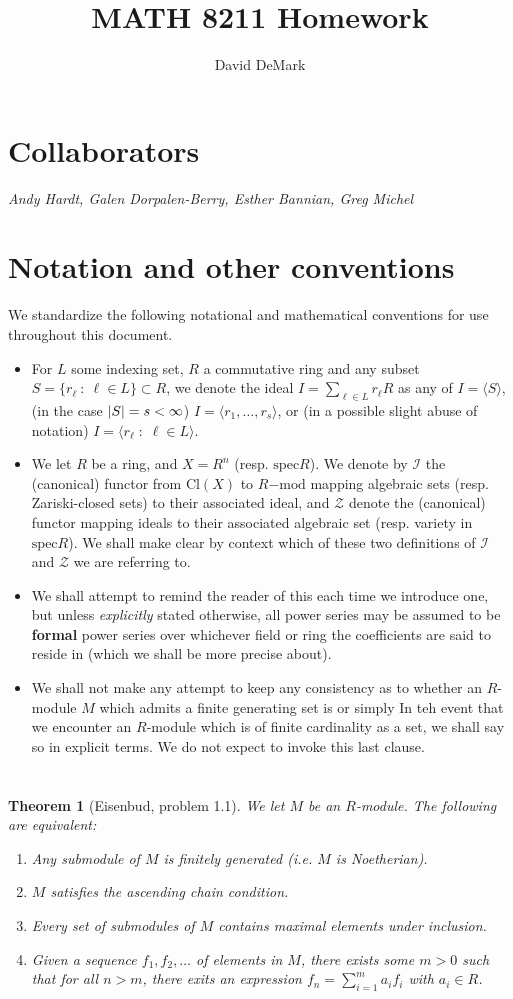 \documentclass[english]{article}
\title{MATH 8211 Homework}
\author{David DeMark}
\date{\due}
\DeclarePairedDelimiter\abs{\lvert}{\rvert}%
\newcommand{\Zcal}{\mathcal{Z}}
\newcommand{\prob}[1]{\setcounter{section}{#1-1}\section{}}
\newtheorem*{theorem*}{Theorem}
\theoremstyle{remark}
\theoremstyle{definition}
\newcommand{\gen}[1]{\langle #1 \rangle}
\newcommand{\genb}[2]{\langle #1\;:\;#2 \rangle}
\newcommand{\setc}[2]{\{ #1\::\:#2 \}}
\newcommand{\spec}{\mathrm{spec}}
\begin{document}
	\maketitle
	\section*{Collaborators}
	\textit{Andy Hardt, Galen Dorpalen-Berry, Esther Bannian, Greg Michel}
	\section*{Notation and other conventions}
	We standardize the following notational and mathematical conventions for use throughout this document. \begin{itemize}
		\item For $L$ some indexing set, $R$ a commutative ring and any subset $S=\setc{r_\ell}{\ell\in L }\subset R$, we denote the ideal $I=\sum_{\ell \in L} r_\ell R$ as any of $I=\gen{S}$, (in the case $\abs{S}=s<\infty$) $I=\gen{r_1,\hdots, r_s}$, or (in a possible slight abuse of notation) $I=\genb{r_\ell}{\ell\in L}$.
		\item We let $R$ be a ring, and $X=R^n$ (resp. $\spec R$). We denote by $\mathcal{I}$ the (canonical) functor from $\mathrm{Cl}(X)$ to $R\mathrm{-mod}$ mapping algebraic sets (resp. Zariski-closed sets) to their associated ideal, and $\mathcal{Z}$ denote the (canonical) functor mapping ideals to their associated algebraic set (resp. variety in $\spec R$). We shall make clear by context which of these two definitions of $\mathcal{I}$ and $\Zcal$ we are referring to.
		\item We shall attempt to remind the reader of this each time we introduce one, but unless \emph{explicitly} stated otherwise, all power series may be assumed to be \textbf{formal} power series over whichever field or ring the coefficients are said to reside in (which we shall be more precise about). 
		\item We shall not make any attempt to keep any consistency as to whether an $R$-module $M$ which admits a finite generating set is  or simply  In teh event that we encounter an $R$-module which is of finite cardinality as a set, we shall say so in explicit terms. We do not expect to invoke this last clause.
	\end{itemize}
\prob{1}
\begin{theorem*}[Eisenbud, problem 1.1]
 We let $M$ be an $R$-module. The following are equivalent:\begin{enumerate}[label=\emph{(\roman*)}]
 	\item Any submodule of $M$ is finitely generated (i.e. $M$ is Noetherian).
 	\item $M$ satisfies the ascending chain condition.
 	\item Every set of submodules of $M$ contains maximal elements under inclusion. 
 	\item Given a sequence $f_1,f_2,\hdots$ of elements in $M$, there exists some $m>0$ such that for all $n>m$, there exits an expression $f_n=\sum_{i=1}^m a_i f_i$ with $a_i\in R$. 
 \end{enumerate}
\end{theorem*}
\end{document}
